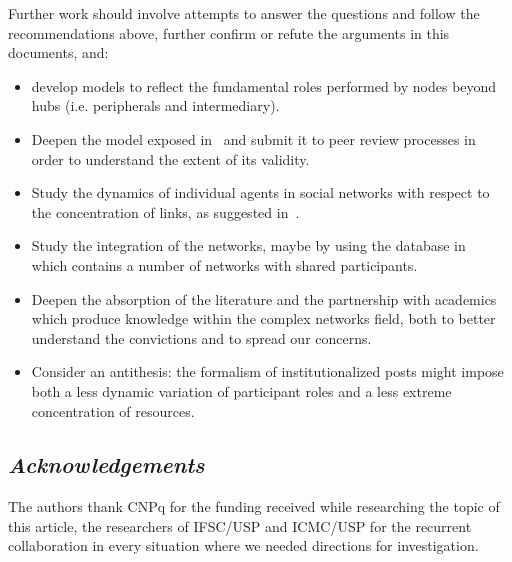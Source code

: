 \documentclass[12pt,fleqn]{article}
\begin{document}
Further work should involve attempts to answer the questions and follow the recommendations above,
further confirm or refute the arguments in this documents, and:
\begin{itemize}
	\item develop models to reflect the fundamental roles performed by nodes beyond hubs (i.e.
		peripherals and intermediary).
	\item Deepen the model exposed in~\cite{fabbri3} and submit it to peer review processes in order
		to understand the extent of its validity.
	\item Study the dynamics of individual agents in social networks with respect to the concentration of links,
		as suggested in~\cite{fabbri1,fabbri2,versinus}.
	\item Study the integration of the networks, maybe by using the database in~\cite{losd} which
		contains a number of networks with shared participants.
	\item Deepen the absorption of the literature and the partnership with academics which produce
		knowledge within the complex networks field, both to better understand the convictions
		and to spread our concerns.
	\item Consider an antithesis: the formalism of institutionalized posts
		might impose both a less dynamic variation of participant roles
		and a less extreme concentration of resources.
\end{itemize}

\subsection*{\textit{Acknowledgements}}
The authors thank CNPq for the funding received while researching the topic of this article,
the researchers of IFSC/USP and ICMC/USP for the recurrent collaboration in every situation
where we needed directions for investigation.
\end{document}
